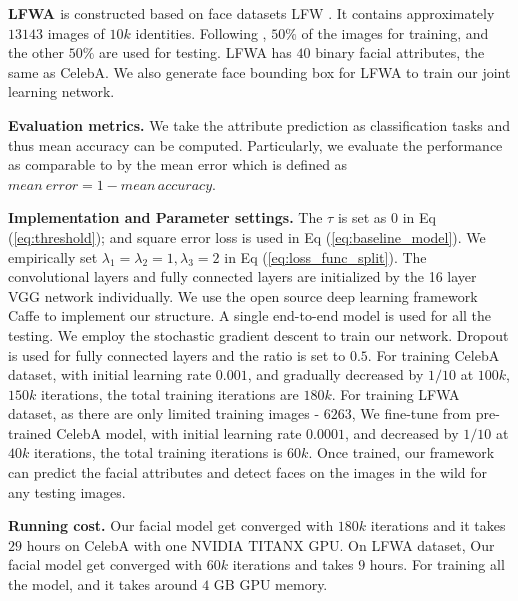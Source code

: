 \documentclass[10pt,twocolumn,letterpaper]{article}
\begin{document}
\noindent \textbf{LFWA \cite{liu2015deep}} is constructed based on
face datasets LFW \cite{huang2007labeled}. It contains approximately
$13143$ images of $10k$ identities. Following \cite{liu2015deep},
$50\%$ of the images for training, and the other $50\%$ are used
for testing. LFWA has $40$ binary facial attributes, the same as
CelebA. We also generate face bounding box for LFWA to train our joint
learning network.

\vspace{0.05in}

\noindent \textbf{Evaluation metrics.} We take the attribute prediction
as classification tasks and thus mean accuracy can be computed. Particularly,
we evaluate the performance as comparable to \cite{rudd2016moon,liu2015deep}
by the mean error which is defined as $mean\:error=1-mean\,accuracy$.

\vspace{0.05in}

\noindent \textbf{Implementation and Parameter settings.} The $\tau$
is set as $0$ in Eq (\ref{eq:threshold}); and square error loss
is used in Eq (\ref{eq:baseline_model}). We empirically set $\lambda_{1}=\lambda_{2}=1,\lambda_{3}=2$
in Eq (\ref{eq:loss_func_split}). The convolutional layers and fully
connected layers are initialized by the 16 layer VGG network \cite{returnDevil2014BMVC}
individually. We use the open source deep learning framework Caffe
\cite{caffe} to implement our structure. A single end-to-end model
is used for all the testing. We employ the stochastic gradient descent
to train our network. Dropout is used for fully connected layers and
the ratio is set to $0.5$. For training CelebA dataset, with initial
learning rate $0.001$, and gradually decreased by $1/10$ at $100k$,
$150k$ iterations, the total training iterations are $180k$. For
training LFWA dataset, as there are only limited training images -
$6263$, We fine-tune from pre-trained CelebA model, with initial
learning rate $0.0001$, and decreased by $1/10$ at $40k$ iterations,
the total training iterations is $60k$. 
Once trained, our framework
can predict the facial attributes and detect faces on the images in
the wild for any testing images. 

\vspace{0.05in} 

\noindent \textbf{Running cost.} Our facial model get converged with
$180k$ iterations and it takes $29$ hours on CelebA
with one NVIDIA TITANX GPU. 
On LFWA dataset, Our facial model get converged with $60k$
iterations and takes $9$ hours. For training
all the model, and it takes around $4$
GB GPU memory.
\end{document}
